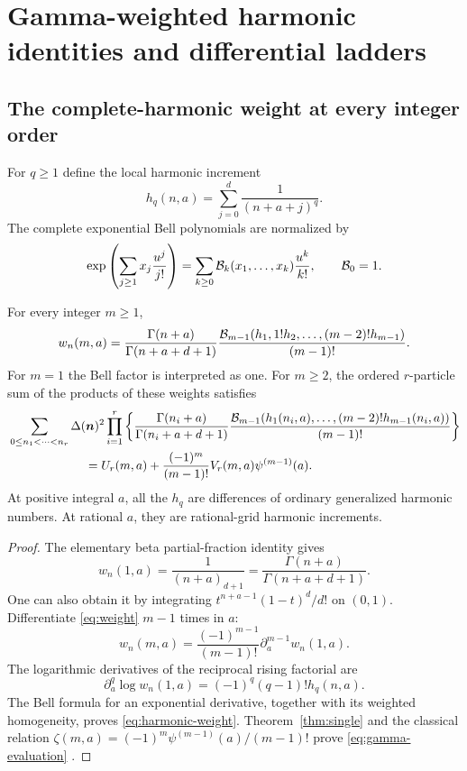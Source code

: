 \section{Gamma-weighted harmonic identities and differential ladders}
\label{sec:gamma}

\subsection{The complete-harmonic weight at every integer order}
For $q\ge1$ define the local harmonic increment
\begin{equation}\label{eq:local-harmonic}
 h_q(n,a)=\sum_{j=0}^d\frac1{(n+a+j)^q}.
\end{equation}
The complete exponential Bell polynomials are normalized by
\begin{equation}\label{eq:bell}
 \exp\left(\sum_{j\ge1}x_j\frac{u^j}{j!}\right)
 =\sum_{k\ge0}\mathcal B_k(x_1,\ldots,x_k)\frac{u^k}{k!},
 \qquad \mathcal B_0=1.
\end{equation}

\begin{theorem}\label{thm:gamma}
For every integer $m\ge1$,
\begin{equation}\label{eq:harmonic-weight}
 w_n(m,a)=\frac{\Gamma(n+a)}{\Gamma(n+a+d+1)}
 \frac{\mathcal B_{m-1}(h_1,1!h_2,\ldots,(m-2)!h_{m-1})}{(m-1)!}.
\end{equation}
For $m=1$ the Bell factor is interpreted as one. For $m\ge2$, the
ordered $r$-particle sum of the products of these weights satisfies
\begin{align}
 &\sum_{0\le n_1<\cdots<n_r}\Delta(\bm n)^2
 \prod_{i=1}^r
 \left\{\frac{\Gamma(n_i+a)}{\Gamma(n_i+a+d+1)}
 \frac{\Bell_{m-1}(h_1(n_i,a),\ldots,(m-2)!h_{m-1}(n_i,a))}
 {(m-1)!}\right\}\notag\\
 &\hspace{22mm}=U_r(m,a)+
        \frac{(-1)^m}{(m-1)!}V_r(m,a)\psi^{(m-1)}(a).
 \label{eq:gamma-evaluation}
\end{align}
At positive integral $a$, all the $h_q$ are differences of ordinary
generalized harmonic numbers. At rational $a$, they are rational-grid
harmonic increments.
\end{theorem}
\begin{proof}
The elementary beta partial-fraction identity gives
\[
 w_n(1,a)=\frac1{(n+a)_{d+1}}
        =\frac{\Gamma(n+a)}{\Gamma(n+a+d+1)}.
\]
One can also obtain it by integrating
$t^{n+a-1}(1-t)^d/d!$ on $(0,1)$.
Differentiate \eqref{eq:weight} $m-1$ times in $a$:
\begin{equation}\label{eq:weight-derivative-integer}
 w_n(m,a)=\frac{(-1)^{m-1}}{(m-1)!}
          \partial_a^{m-1}w_n(1,a).
\end{equation}
The logarithmic derivatives of the reciprocal rising factorial are
\[
 \partial_a^q\log w_n(1,a)
     =(-1)^q(q-1)!h_q(n,a).
\]
The Bell formula for an exponential derivative, together with its weighted
homogeneity, proves \eqref{eq:harmonic-weight}. Theorem~\ref{thm:single}
and the classical relation
$\zeta(m,a)=(-1)^m\psi^{(m-1)}(a)/(m-1)!$ prove
\eqref{eq:gamma-evaluation} \cite{dlmf:hurwitz}.
\end{proof}

